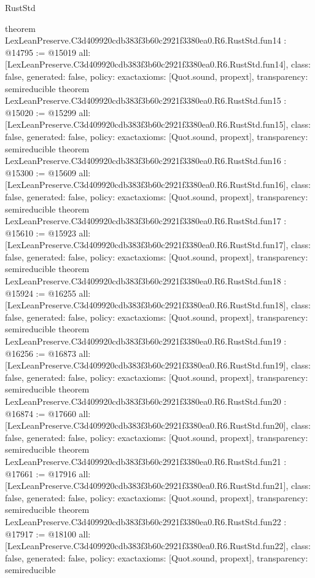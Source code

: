 \begin{lexlean}{RustStd}
\begin{coremodule}
{}
theorem LexLeanPreserve.C3d409920cdb383f3b60c2921f3380ea0.R6.RustStd.fun14 : @14795 := @15019 {
  all: [LexLeanPreserve.C3d409920cdb383f3b60c2921f3380ea0.R6.RustStd.fun14],
  class: false,
  generated: false,
  policy: exact{axioms: [Quot.sound, propext]},
  transparency: semireducible
}
theorem LexLeanPreserve.C3d409920cdb383f3b60c2921f3380ea0.R6.RustStd.fun15 : @15020 := @15299 {
  all: [LexLeanPreserve.C3d409920cdb383f3b60c2921f3380ea0.R6.RustStd.fun15],
  class: false,
  generated: false,
  policy: exact{axioms: [Quot.sound, propext]},
  transparency: semireducible
}
theorem LexLeanPreserve.C3d409920cdb383f3b60c2921f3380ea0.R6.RustStd.fun16 : @15300 := @15609 {
  all: [LexLeanPreserve.C3d409920cdb383f3b60c2921f3380ea0.R6.RustStd.fun16],
  class: false,
  generated: false,
  policy: exact{axioms: [Quot.sound, propext]},
  transparency: semireducible
}
theorem LexLeanPreserve.C3d409920cdb383f3b60c2921f3380ea0.R6.RustStd.fun17 : @15610 := @15923 {
  all: [LexLeanPreserve.C3d409920cdb383f3b60c2921f3380ea0.R6.RustStd.fun17],
  class: false,
  generated: false,
  policy: exact{axioms: [Quot.sound, propext]},
  transparency: semireducible
}
theorem LexLeanPreserve.C3d409920cdb383f3b60c2921f3380ea0.R6.RustStd.fun18 : @15924 := @16255 {
  all: [LexLeanPreserve.C3d409920cdb383f3b60c2921f3380ea0.R6.RustStd.fun18],
  class: false,
  generated: false,
  policy: exact{axioms: [Quot.sound, propext]},
  transparency: semireducible
}
theorem LexLeanPreserve.C3d409920cdb383f3b60c2921f3380ea0.R6.RustStd.fun19 : @16256 := @16873 {
  all: [LexLeanPreserve.C3d409920cdb383f3b60c2921f3380ea0.R6.RustStd.fun19],
  class: false,
  generated: false,
  policy: exact{axioms: [Quot.sound, propext]},
  transparency: semireducible
}
theorem LexLeanPreserve.C3d409920cdb383f3b60c2921f3380ea0.R6.RustStd.fun20 : @16874 := @17660 {
  all: [LexLeanPreserve.C3d409920cdb383f3b60c2921f3380ea0.R6.RustStd.fun20],
  class: false,
  generated: false,
  policy: exact{axioms: [Quot.sound, propext]},
  transparency: semireducible
}
theorem LexLeanPreserve.C3d409920cdb383f3b60c2921f3380ea0.R6.RustStd.fun21 : @17661 := @17916 {
  all: [LexLeanPreserve.C3d409920cdb383f3b60c2921f3380ea0.R6.RustStd.fun21],
  class: false,
  generated: false,
  policy: exact{axioms: [Quot.sound, propext]},
  transparency: semireducible
}
theorem LexLeanPreserve.C3d409920cdb383f3b60c2921f3380ea0.R6.RustStd.fun22 : @17917 := @18100 {
  all: [LexLeanPreserve.C3d409920cdb383f3b60c2921f3380ea0.R6.RustStd.fun22],
  class: false,
  generated: false,
  policy: exact{axioms: [Quot.sound, propext]},
  transparency: semireducible
}
\end{coremodule}
\end{lexlean}

